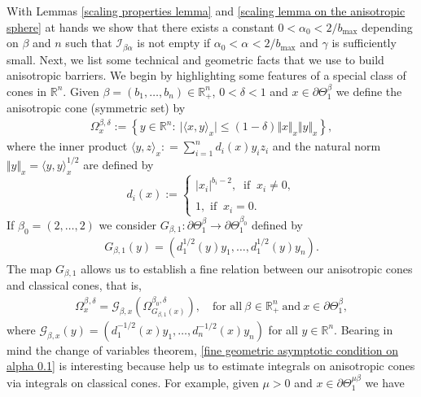 \documentclass[10pt, leqno]{article}
\theoremstyle{definition}
\theoremstyle{remark}
\numberwithin{equation}{section}
\begin{document}
With Lemmas \ref{scaling properties lemma} and \ref{scaling lemma on the anisotropic sphere} at hands we show that there exists a constant $0 < \alpha_{0} < 2/b_{\max}$ depending on $\beta$ and $n$ such that $\mathcal{I}_{\beta\alpha}$ is not empty if $\alpha_{0} < \alpha_{} < 2/b_{\max}$ and $\gamma$ is sufficiently small. Next, we list some technical and geometric facts that we use to build anisotropic barriers. We begin by highlighting some features of a special class of cones in $\mathbb{R}^{n}$. Given $\beta=(b_{1}, \dots, b_{n}) \in \mathbb{R}^{n}_{+}$, $0 < \delta < 1$ and $x \in \partial \Theta^{\beta}_{1}$ we define the anisotropic cone (symmetric set) by
\begin{eqnarray}
\Omega^{\beta, \delta}_{x} := \left \lbrace y \in \mathbb{R}^{n}: \ \vert \langle x, y \rangle_{x}\vert \leq (1 - \delta) \Vert x \Vert_{x} \Vert y \Vert_{x}\right \rbrace,
\end{eqnarray}
where the inner product $\langle y, z \rangle_{x} : = \displaystyle \sum_{i=1}^{n}d_{i}(x) y_{i}z_{i}$ and the natural norm $\Vert y \Vert_{x} = \langle y, y \rangle_{x}^{1/2}$ are defined by
$$
d_{i}(x) :=\left \{
\begin{array}{ll}
\vert x_{i}\vert^{b_{i} - 2}, \ \text{ if } \ x_{i} \neq 0, \\
\\
1, \text{ if } \  x_{i}= 0.
\end{array}
\right.
$$
If $\beta_{0} = (2, \dots, 2)$ we consider $G_{\beta, 1}: \partial \Theta^{\beta}_{1} \rightarrow \partial \Theta^{\beta_{0}}_{1}$ defined by
\begin{eqnarray*}
G_{\beta, 1}(y)= \left(d^{1/2}_{1}(y) y_{1} , \dots, d^{1/2}_{1}(y) y_{n} \right).
\end{eqnarray*}
The map $G_{\beta, 1}$ allows us to establish a fine relation between our anisotropic cones and classical cones, that is,
\begin{eqnarray}
\label{fine geometric asymptotic condition on alpha 0.1}
\Omega^{\beta_{}, \delta}_{x} = \mathcal{G}^{}_{\beta, x}\left(\Omega^{\beta_{0}, \delta}_{G_{\beta, 1}(x)} \right), \quad \text{for all} \ \beta_{} \in \mathbb{R}^{n}_{+} \ \text{and} \ x \in \partial \Theta^{\beta}_{1},
\end{eqnarray}
where $\mathcal{G}^{}_{\beta, x}(y) = \left( d^{-1/2}_{1}(x) y_{1}, \dots, d^{-1/2}_{n}(x) y_{n} \right)$ for all $y \in \mathbb{R}^{n}$. Bearing in mind the change of variables theorem, \eqref{fine geometric asymptotic condition on alpha 0.1} is interesting because help us to estimate integrals on anisotropic cones via integrals on classical cones. For example, given $\mu>0$ and $x \in \partial \Theta^{\mu \beta}_{1}$ we have
\end{document}

